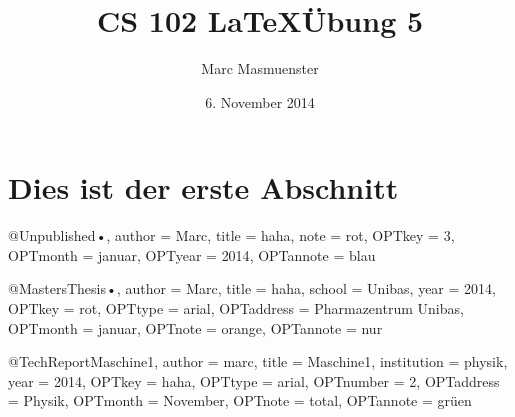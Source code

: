\documentclass{article}
\author{Marc Masmuenster}
\title{CS 102 \LaTeX  \"Ubung 5}
\date{6. November 2014}
\begin{document}
\maketitle
\section{Dies ist der erste Abschnitt}

@Unpublished{•,
author = {Marc},
title = {haha},
note = {rot},
OPTkey = {3},
OPTmonth = {januar},
OPTyear = {2014},
OPTannote = {blau}
}



@MastersThesis{•,
author = {Marc},
title = {haha},
school = {Unibas},
year = {2014},
OPTkey = {rot},
OPTtype = {arial},
OPTaddress = {Pharmazentrum Unibas},
OPTmonth = {januar},
OPTnote = {orange},
OPTannote = {nur}
}

@TechReport{Maschine1,
author = {marc},
title = {Maschine1},
institution = {physik},
year = {2014},
OPTkey = {haha},
OPTtype = {arial},
OPTnumber = {2},
OPTaddress = {Physik},
OPTmonth = {November},
OPTnote = {total},
OPTannote = {grüen}
}
\end{document}
